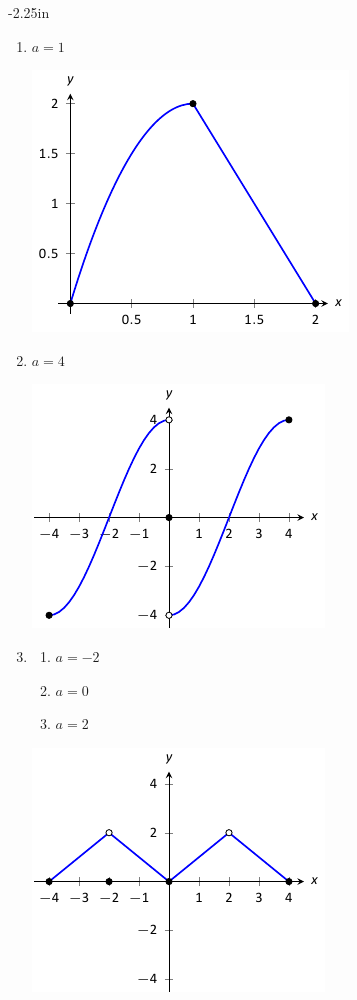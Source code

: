 \begin{adjustwidth*}{}{-2.25in}
\begin{multicols*}{2}
\begin{enumerate}[1),resume]
\item
{\noindent $a = 1$

\includegraphics[scale=.8]{figures/fig01_04_ex_09}
}

\item
{\noindent $a = 4$

\includegraphics[scale=.8]{figures/fig01_04_ex_10}
}

\item
{\begin{enumerate}
\item		$a = -2$
\item		$a=0$
\item		$a=2$
\end{enumerate}

\includegraphics[scale=.8]{figures/fig01_04_ex_11}
}

\end{enumerate}

\vspace{.5cm}

\end{multicols*}
\end{adjustwidth*}

